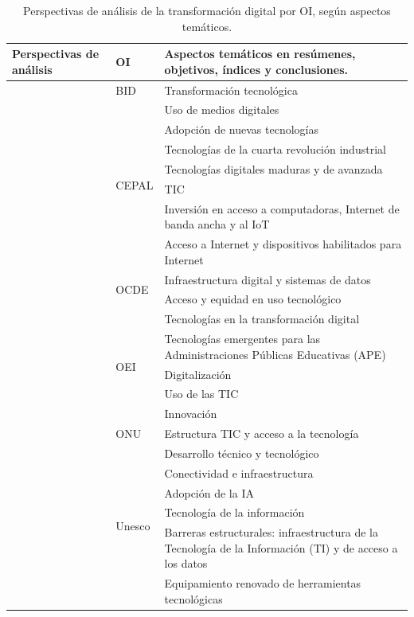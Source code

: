 \newpage
\begin{longtable}{
>{\raggedright\arraybackslash}p{} l >{\raggedright\arraybackslash}p{}}
\caption{Perspectivas de análisis de la transformación digital por OI, según aspectos temáticos.}
\label{tab-11}\\
\toprule
Perspectivas de análisis & OI & Aspectos temáticos en resúmenes, objetivos, índices y conclusiones.\\
\midrule
    \multirow{22}{=}{Aspecto tecnológico} & BID & Transformación
    tecnológica \\
    & \multirow{7}{*}{CEPAL} & Uso de medios digitales \\
    & & Adopción de nuevas tecnologías \\
    & & Tecnologías de la cuarta revolución industrial \\
    & & Tecnologías digitales maduras y de avanzada \\
    & & TIC \\
    & & Inversión en acceso a computadoras, Internet de banda ancha y al
    IoT \\
    & & Acceso a Internet y dispositivos habilitados para Internet \\
    & \multirow{2}{*}{OCDE} & Infraestructura digital y sistemas de datos \\
    & & Acceso y equidad en uso tecnológico \\
    & \multirow{5}{*}{OEI} & Tecnologías en la transformación digital \\
    & & Tecnologías emergentes para las Administraciones Públicas Educativas
    (APE) \\
    & & Digitalización \\
    & & Uso de las TIC \\
    & & Innovación \\
    & ONU & Estructura TIC y acceso a la tecnología \\
    & \multirow{6}{*}{Unesco} & Desarrollo técnico y tecnológico \\
    & & Conectividad e infraestructura \\
    & & Adopción de la IA \\
    & & Tecnología de la información \\
    & & Barreras estructurales: infraestructura de la Tecnología de la
    Información (TI) y de acceso a los datos \\
    & & Equipamiento renovado de herramientas tecnológicas \\

\end{longtable}
